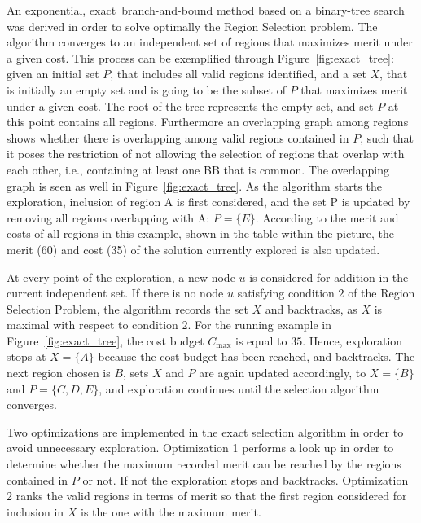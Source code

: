 \documentclass[]{usiinfthesis}
\newcommand{\exact}{\textsf{exact}}
\begin{document}
An exponential, \exact\ branch-and-bound method
based on a binary-tree search was derived in order to solve optimally 
the Region Selection problem. The algorithm converges to an
independent set of regions that maximizes merit under 
a given cost.
This process can be exemplified through
 Figure~\ref{fig:exact_tree}: given an initial set $P$, that includes all
 valid regions identified, and a set $X$, that is initially an empty set and 
is going to be the subset of $P$ that maximizes merit under a given cost.
The root of the tree represents the empty set, and set $P$ at this
point contains all regions. Furthermore an overlapping graph among regions 
shows whether there is overlapping among valid regions contained in $P$, 
such that it poses the restriction of not allowing the selection of regions 
that overlap with each other, i.e., containing at least one BB that is common. 
The overlapping graph is seen as well in Figure~\ref{fig:exact_tree}.
As the algorithm starts the exploration, inclusion of region A is first
considered, and the set P is updated by removing all regions overlapping
with A: $P = \{E\}$. According to the merit and costs of all regions
in this example, shown in the table within the picture, the merit (60)
and cost (35) of the solution currently explored is also updated.\par

At every point of the exploration, a new node $u$ is considered for
addition in the current independent set.
If there is no node $u$
satisfying condition $2$ of the Region Selection Problem, the algorithm
records the set $X$ and backtracks, as $X$ is maximal with respect to
condition $2$.  For the running example in
Figure~\ref{fig:exact_tree}, the cost budget $C_{\max}$ is equal to
$35$. Hence, exploration stops at $X=\{A\}$ because the cost budget
has been reached, and backtracks. The next region chosen is $B$, sets
$X$ and $P$ are again updated accordingly, to $X=\{B\}$ and
$P=\{C,D,E\}$, and exploration continues until the selection algorithm
converges.\par

Two optimizations are implemented in the exact selection algorithm in order 
to avoid unnecessary exploration. Optimization 1 performs a look up in order 
to determine whether the maximum recorded merit can be reached by the 
regions contained in $P$ or not. If not the exploration stops and backtracks.
Optimization 2 ranks the valid regions in terms of merit so that the first 
region considered for inclusion in $X$ is the one with the maximum merit.
\end{document}
